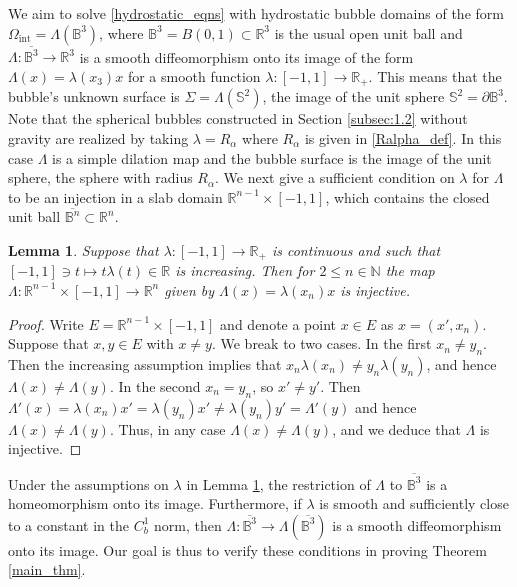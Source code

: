 \documentclass[11pt,reqno]{amsart}
\numberwithin{equation}{section}
\def\p{\partial}
\def\p{\partial}
\newcommand{\m}{\mathrm}
\def\N{\mathbb{N}}
\def\R{\mathbb{R}}
\newtheorem{lem}{Lemma}[section]
\begin{document}
We aim to solve \eqref{hydrostatic_eqns} with hydrostatic bubble domains of the form $\Omega_{\m{int}}=\Lambda(\mathbb{B}^3)$, where $\mathbb{B}^3 = B(0,1) \subset \R^3$ is the usual open unit ball and $\Lambda: \overline{\mathbb B^3} \to \R^3 $ %
is a smooth diffeomorphism onto its image of the form $\Lambda(x) = \lambda(x_3) x$ for a smooth function $\lambda : [-1,1] \to \R_+$. %
This means that the bubble's unknown surface is $\Sigma = \Lambda(\mathbb{S}^2)$, the image of the unit sphere $\mathbb{S}^2 = \p \mathbb{B}^3$. Note that the spherical bubbles constructed in Section \ref{subsec:1.2} without gravity are realized by taking $\lambda = R_\alpha$ where $R_\alpha$ is given in \eqref{Ralpha_def}. In this case $\Lambda$ is a simple dilation map and the bubble surface is the image of the unit sphere, the sphere with radius $R_\alpha$.  We next give a sufficient condition on $\lambda$ for $\Lambda$ to be an injection in a slab domain $\R^{n-1} \times [-1,1]$, which contains the closed unit ball $\overline{\mathbb B^n} \subset \R^n$. 



\begin{lem}\label{lem:injective}
Suppose that $\lambda : [-1,1] \to \R_+$ is continuous and such that $[-1,1] \ni t \mapsto t \lambda(t) \in \R$ is increasing.  Then for $2 \le n \in \N$ the map $\Lambda : \R^{n-1} \times [-1,1] \to \R^n$ given by $\Lambda(x) = \lambda(x_n) x$ is injective.
\end{lem}
\begin{proof}
Write $E = \R^{n-1} \times [-1,1]$ and denote a point $x \in E$ as $x = (x',x_n)$.  Suppose that $x,y \in E$ with $x \neq y$.  We break to two cases.  In the first $x_n \neq y_n$. Then the increasing assumption implies that $x_n \lambda(x_n) \neq y_n \lambda(y_n)$, and hence  $\Lambda(x) \neq \Lambda(y)$.  In the second $x_n = y_n$, so $x' \neq y'$.  Then $\Lambda'(x) = \lambda(x_n) x' = \lambda(y_n) x' \neq \lambda(y_n) y' = \Lambda'(y)$ and hence  $\Lambda(x) \neq \Lambda(y)$.
Thus, in any case $\Lambda(x) \neq \Lambda(y)$, and we deduce that $\Lambda$ is injective.
\end{proof}

Under the assumptions on $\lambda$ in Lemma \ref{lem:injective}, the restriction of $\Lambda$ to $\overline{\mathbb B^3}$ is a homeomorphism onto its image. Furthermore, if $\lambda$ is smooth  and sufficiently close to a constant in the $C^1_b$ norm, then $\Lambda: \overline{\mathbb B^3} \to \Lambda(\overline{\mathbb{B}^3})$ is a smooth diffeomorphism onto its image.  Our goal is thus to verify these conditions in proving Theorem \ref{main_thm}. 
\end{document}
